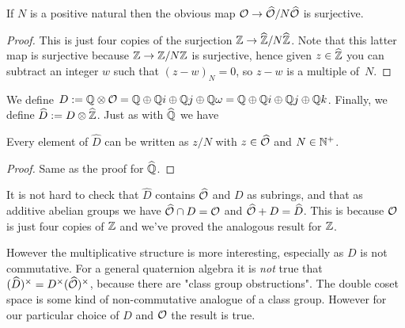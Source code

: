 \begin{theorem} If $N$ is a positive natural then the obvious map
    $\mathcal{O}\to\widehat{\mathcal{O}}/N\widehat{\mathcal{O}}$ is surjective.
\end{theorem}
\begin{proof}
      This is just four copies of the surjection $\mathbb{Z}\to\widehat{\mathbb{Z}}/N\widehat{\mathbb{Z}}$.
      Note that this latter map is surjective because $\mathbb{Z}\to\mathbb{Z}/N\mathbb{Z}$ is surjective,
      hence given $z\in\widehat{\mathbb{Z}}$ you can subtract an integer $w$ such
      that $(z-w)_N=0$, so $z-w$ is a multiple of~$N$.
\end{proof}

We define $D:=\mathbb{Q}\otimes\mathcal{O}=\mathbb{Q}\oplus\mathbb{Q} i\oplus\mathbb{Q} j\oplus\mathbb{Q}\omega=\mathbb{Q}\oplus\mathbb{Q} i\oplus\mathbb{Q} j\oplus\mathbb{Q} k$.
Finally, we define $\widehat{D}:=D\otimes\widehat{\mathbb{Z}}$. Just as with $\widehat{\mathbb{Q}}$ we have

\begin{lemma}
    \label{Hurwitz.canonicalForm}
    \leanok
    Every element of $\widehat{D}$ can be written as $z/N$ with $z\in\widehat{\mathcal{O}}$ and $N\in\mathbb{N}^+$.
\end{lemma}
\begin{proof}
    Same as the proof for $\widehat{\mathbb{Q}}$.
\end{proof}

It is not hard to check that $\widehat{D}$ contains $\widehat{\mathcal{O}}$
and $D$ as subrings, and that as additive abelian groups we have
$\widehat{\mathcal{O}}\cap D=\mathcal{O}$ and $\widehat{\mathcal{O}}+D=\widehat{D}$.
This is because $\mathcal{O}$ is just four copies of $\mathbb{Z}$ and we've proved
the analogous result for $\mathbb{Z}$.

However the multiplicative structure is more interesting, especially
as $D$ is not commutative. For a general quaternion algebra it is \emph{not}
true that $(\widehat{D})^\times=D^\times(\widehat{\mathcal{O}})^\times$, because
there are "class group obstructions". The double coset space is some
kind of non-commutative analogue of a class group. However for our
particular choice of $D$ and $\mathcal{O}$ the result is true.

